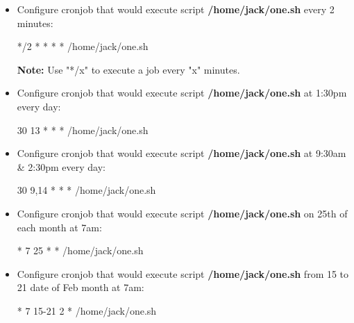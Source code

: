 \setlength{\columnsep}{3pt}
\begin{flushleft}
	\begin{itemize}
		\item Configure cronjob that would execute script \textbf{/home/jack/one.sh} every 2 minutes:
		\begin{tcolorbox}[breakable,notitle,boxrule=-0pt,colback=teal,colframe=teal]
			\color{white}
			\font=9pt
			*/2     *    *   *   *  /home/jack/one.sh
			\font=4pt
		\end{tcolorbox}
		\bigskip
		
		\begin{tcolorbox}[breakable,notitle,boxrule=-0pt,colback=yellow,colframe=yellow]
			\color{black}
			\textbf{Note:} Use "*/x" to execute a job every "x" minutes.
		\end{tcolorbox}
		
		
		\bigskip
		\bigskip
		\item Configure cronjob that would execute script \textbf{/home/jack/one.sh} at 1:30pm every day:
		\begin{tcolorbox}[breakable,notitle,boxrule=-0pt,colback=teal,colframe=teal]
			\color{white}
			\font=9pt
			30     13    *   *   *  /home/jack/one.sh
			\font=4pt
		\end{tcolorbox}
		
		\bigskip
		\bigskip
		\item Configure cronjob that would execute script \textbf{/home/jack/one.sh} at 9:30am \& 2:30pm every day:
		\begin{tcolorbox}[breakable,notitle,boxrule=-0pt,colback=teal,colframe=teal]
			\color{white}
			\font=9pt
			30     9,14    *   *   *  /home/jack/one.sh
			\font=4pt
		\end{tcolorbox}
		
		\bigskip
		\bigskip
		\item Configure cronjob that would execute script \textbf{/home/jack/one.sh} on 25th of each month at 7am:
		\begin{tcolorbox}[breakable,notitle,boxrule=-0pt,colback=teal,colframe=teal]
			\color{white}
			\font=9pt
			*     7    25   *   *  /home/jack/one.sh
			\font=4pt
		\end{tcolorbox}

		\bigskip
		\bigskip
		\item Configure cronjob that would execute script \textbf{/home/jack/one.sh} from 15 to 21 date of Feb month at 7am:
		\begin{tcolorbox}[breakable,notitle,boxrule=-0pt,colback=teal,colframe=teal]
			\color{white}
			\font=9pt
			*     7    15-21   2   *  /home/jack/one.sh
			\font=4pt
		\end{tcolorbox}
		\bigskip


\end{itemize}
\end{flushleft}
